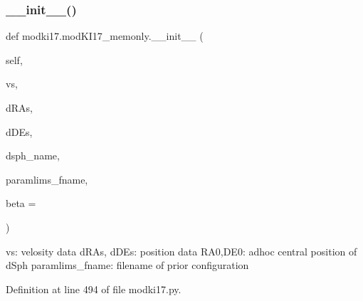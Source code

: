 \subsubsection{\texorpdfstring{\+\_\+\+\_\+init\+\_\+\+\_\+()}{\_\_init\_\_()}}
{\footnotesize\ttfamily def modki17.\+mod\+K\+I17\+\_\+memonly.\+\_\+\+\_\+init\+\_\+\+\_\+ (\begin{DoxyParamCaption}\item[{}]{self,  }\item[{}]{vs,  }\item[{}]{d\+R\+As,  }\item[{}]{d\+D\+Es,  }\item[{}]{dsph\+\_\+name,  }\item[{}]{paramlims\+\_\+fname,  }\item[{}]{beta = {} }\end{DoxyParamCaption})}

\begin{DoxyVerb}vs: velosity data
dRAs, dDEs: position data
RA0,DE0: adhoc central position of dSph 
paramlims_fname: filename of prior configuration
\end{DoxyVerb}
 

Definition at line 494 of file modki17.\+py.


